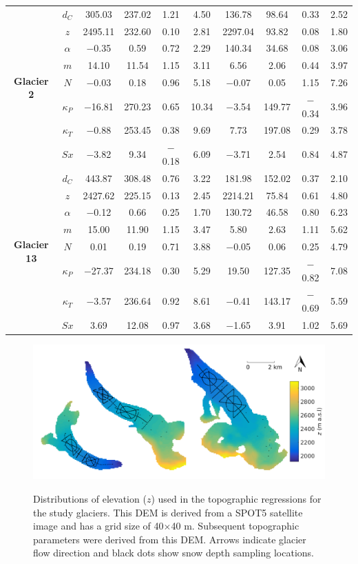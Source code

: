 \documentclass[12pt]{article}
\newcommand{\topomap}{Arrows indicate glacier flow direction and black dots show snow depth sampling locations.}
\begin{document}
\begin{landscape}
\begin{table}[]
\begin{tabular}{cc|cccc|cccc}
\multirow{8}{*}{\textbf{Glacier 2}} & $d_C$ & 305.03 & 237.02 & 1.21 & 4.50 & 136.78 & 98.64 & 0.33 & 2.52 \\
 & $z$ & 2495.11 & 232.60 & 0.10 & 2.81 & 2297.04 & 93.82 & 0.08 & 1.80 \\
 & $\alpha$ &  $-$0.35 & 0.59 & 0.72 & 2.29 & 140.34 & 34.68 & 0.08 & 3.06 \\
 & $m$ & 14.10 & 11.54 & 1.15 & 3.11 & 6.56 & 2.06 & 0.44 & 3.97 \\
 & $N$ &  $-$0.03 & 0.18 & 0.96 & 5.18 &  $-$0.07 & 0.05 & 1.15 & 7.26 \\
 & $\kappa_P$ &  $-$16.81 & 270.23 & 0.65 & 10.34 &  $-$3.54 & 149.77 &  $-$0.34 & 3.96 \\
 & $\kappa_T$ &  $-$0.88 & 253.45 & 0.38 & 9.69 & 7.73 & 197.08 & 0.29 & 3.78 \\
 & $Sx$ &  $-$3.82 & 9.34 &  $-$0.18 & 6.09 &  $-$3.71 & 2.54 & 0.84 & 4.87 \\ \hline
\multirow{8}{*}{\textbf{Glacier 13}} & $d_C$ & 443.87 & 308.48 & 0.76 & 3.22 & 181.98 & 152.02 & 0.37 & 2.10 \\
 & $z$ & 2427.62 & 225.15 & 0.13 & 2.45 & 2214.21 & 75.84 & 0.61 & 4.80 \\
 & $\alpha$ &  $-$0.12 & 0.66 & 0.25 & 1.70 & 130.72 & 46.58 & 0.80 & 6.23 \\
 & $m$ & 15.00 & 11.90 & 1.15 & 3.47 & 5.80 & 2.63 & 1.11 & 5.62 \\
 & $N$ & 0.01 & 0.19 & 0.71 & 3.88 &  $-$0.05 & 0.06 & 0.25 & 4.79 \\
 & $\kappa_P$ &  $-$27.37 & 234.18 & 0.30 & 5.29 & 19.50 & 127.35 &  $-$0.82 & 7.08 \\
 & $\kappa_T$ &  $-$3.57 & 236.64 & 0.92 & 8.61 &  $-$0.41 & 143.17 &  $-$0.69 & 5.59 \\
 & $Sx$ & 3.69 & 12.08 & 0.97 & 3.68 &  $-$1.65 & 3.91 & 1.02 & 5.69
\end{tabular}
\end{table}
\end{landscape}

\pagebreak
\begin{figure}[H]
	\centering
	\includegraphics[width = \textwidth]{Map_elevation.png}\\
	\caption{Distributions of elevation ($z$) used in the topographic regressions for the study glaciers. This DEM is derived from a SPOT5 satellite image and has a grid size of 40$\times$40 m. Subsequent topographic parameters were derived from this DEM. \topomap}
	\label{map:elev}
\end{figure}
\end{document}
